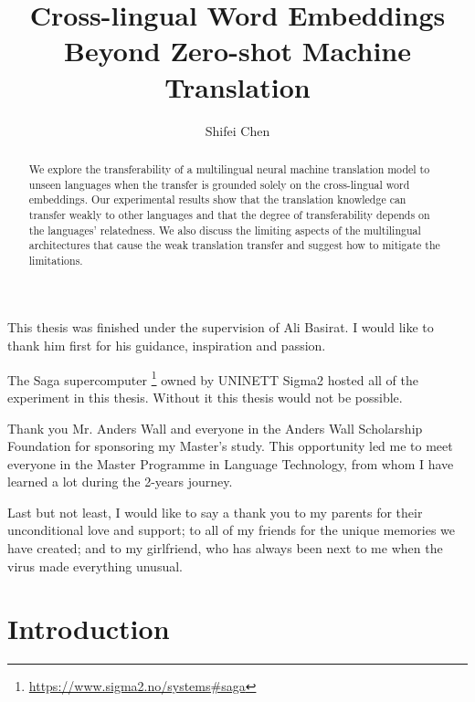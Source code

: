 \documentclass[thesis,fonts=libertine]{cluu}
\begin{document}
\author{Shifei Chen}
\title{Cross-lingual Word Embeddings Beyond Zero-shot Machine Translation}

\maketitle

\begin{abstract}
  We explore the transferability of a multilingual neural machine translation model to unseen languages when the transfer is grounded solely on the cross-lingual word embeddings. Our experimental results show that the translation knowledge can transfer weakly to other languages and that the degree of transferability depends on the languages' relatedness. We also discuss the limiting aspects of the multilingual architectures that cause the weak translation transfer and suggest how to mitigate the limitations. 
\end{abstract}

\tableofcontents


This thesis was finished under the supervision of Ali Basirat. I would like 
to thank him first for his guidance, inspiration and passion.

The Saga supercomputer \footnote{\url{https://www.sigma2.no/systems\#saga}} owned by UNINETT Sigma2 hosted all of the experiment in this thesis. Without it this thesis would not be possible.

Thank you Mr. Anders Wall and everyone in the Anders Wall Scholarship Foundation for sponsoring my Master's study. This opportunity led me to meet everyone in the Master Programme in Language Technology, from whom I have learned a lot during the 2-years journey.

Last but not least, I would like to say a thank you to my parents for their unconditional love and support; to all of my friends for the unique memories we have created; and to my girlfriend, who has always been next to me when the virus made everything unusual.


\chapter{Introduction}
\end{document}
